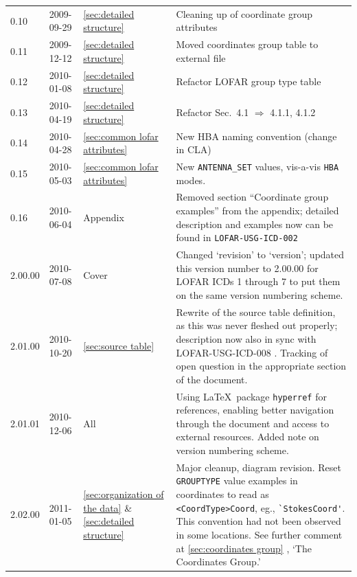 \documentclass[a4paper,10pt,bibtotoc]{scrartcl}
\begin{document}
\begin{center}
\begin{supertabular}{lllp{9.5cm}}
    0.10 & 2009-09-29 &\ref{sec:detailed structure} & Cleaning up of
    coordinate group attributes \\

    0.11 & 2009-12-12 & \ref{sec:detailed structure} & Moved coordinates group
    table to external file \\

    0.12 & 2010-01-08 & \ref{sec:detailed structure} & Refactor LOFAR group
    type table \\

    0.13 & 2010-04-19 & \ref{sec:detailed structure} & Refactor Sec.~4.1
    $\Rightarrow$ 4.1.1, 4.1.2 \\

    0.14 & 2010-04-28 & \ref{sec:common lofar attributes} & New HBA naming
    convention (change in CLA)\\

    0.15 & 2010-05-03 & \ref{sec:common lofar attributes} & New
    \verb|ANTENNA_SET| values, vis-a-vis \verb|HBA| modes.\\

    0.16 & 2010-06-04 & Appendix & Removed section ``Coordinate group examples''
    from the appendix; detailed description and examples now can be found in
    \texttt{LOFAR-USG-ICD-002} \cite{lofar.icd.002} \\

    2.00.00 & 2010-07-08 & Cover & Changed `revision' to `version';  updated
    this version number to 2.00.00 for LOFAR ICDs 1 through 7 to put them on the same
    version numbering scheme.\\

    2.01.00 & 2010-10-20 & \ref{sec:source table} & Rewrite of the source table
    definition, as this was never fleshed out properly; description now also in
    sync with LOFAR-USG-ICD-008 \cite{lofar.icd.008}. Tracking of open question
    in the appropriate section of the document. \\

    2.01.01 & 2010-12-06 & All & Using \LaTeX\ package \texttt{hyperref} for
    references, enabling better navigation through the document and access to
    external resources. Added note on version numbering scheme. \\

    2.02.00 & 2011-01-05 & \ref{sec:organization of the data} \&
    \ref{sec:detailed structure} & Major cleanup, diagram revision.  Reset
    \verb|GROUPTYPE| value examples in coordinates to read as
    \verb|<CoordType>Coord|, eg., \verb|`StokesCoord'|.  This convention had
    not been observed in some locations.  See further comment at
    \ref{sec:coordinates group} , `The Coordinates Group.'\\


\end{supertabular}
\end{center}
\end{document}
